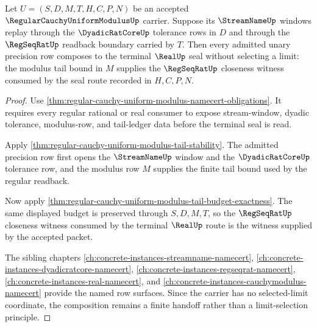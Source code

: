 \begin{theorem}
\label{thm:regular-cauchy-uniform-modulus-tail-composition}
Let $U=(S,D,M,T,H,C,P,N)$ be an accepted
$\RegularCauchyUniformModulusUp$ carrier. Suppose its $\StreamNameUp$ windows replay through the $\DyadicRatCoreUp$ tolerance rows in $D$ and through the $\RegSeqRatUp$ readback boundary carried by $T$. Then every admitted unary precision row composes to the terminal $\RealUp$ seal without selecting a limit: the modulus tail bound in $M$ supplies the $\RegSeqRatUp$ closeness witness consumed by the seal route recorded in $H,C,P,N$.
\end{theorem}
\begin{proof}
Use \autoref{thm:regular-cauchy-uniform-modulus-namecert-obligations}. It requires every regular rational or real consumer to expose stream-window, dyadic tolerance, modulus-row, and tail-ledger data before the terminal seal is read.

Apply \autoref{thm:regular-cauchy-uniform-modulus-tail-stability}. The admitted precision row first opens the $\StreamNameUp$ window and the $\DyadicRatCoreUp$ tolerance row, and the modulus row $M$ supplies the finite tail bound used by the regular readback.

Now apply \autoref{thm:regular-cauchy-uniform-modulus-tail-budget-exactness}. The same displayed budget is preserved through $S,D,M,T$, so the $\RegSeqRatUp$ closeness witness consumed by the terminal $\RealUp$ route is the witness supplied by the accepted packet.

The sibling chapters \autoref{ch:concrete-instances-streamname-namecert}, \autoref{ch:concrete-instances-dyadicratcore-namecert}, \autoref{ch:concrete-instances-regseqrat-namecert}, \autoref{ch:concrete-instances-real-namecert}, and \autoref{ch:concrete-instances-cauchymodulus-namecert} provide the named row surfaces. Since the carrier has no selected-limit coordinate, the composition remains a finite handoff rather than a limit-selection principle.
\end{proof}

